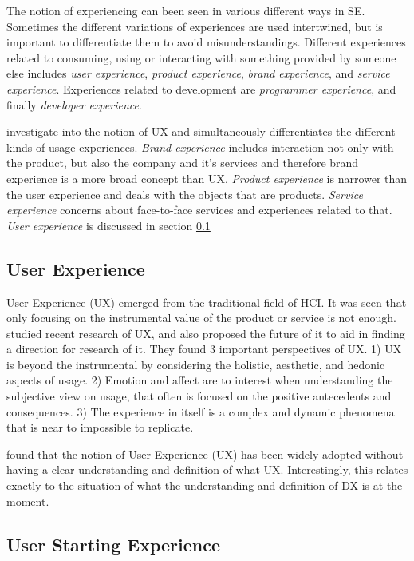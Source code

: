 \documentclass[english, 12pt, a4paper, sci, utf8, a-1b, online]{aaltothesis}
\begin{document}
The notion of experiencing can been seen in various different ways in SE. Sometimes the different variations of experiences are used intertwined, but is important to differentiate them to avoid misunderstandings. Different experiences related to consuming, using or interacting with something provided by someone else includes \textit{user experience}, \textit{product experience}, \textit{brand experience}, and \textit{service experience}. Experiences related to development are \textit{programmer experience}, and finally \textit{developer experience}.

\textcite{understanding-ux} investigate into the notion of UX and simultaneously differentiates the different kinds of usage experiences. \textit{Brand experience} includes interaction not only with the product, but also the company and it's services and therefore brand experience is a more broad concept than UX. \textit{Product experience} is narrower than the user experience and deals with the objects that are products. \textit{Service experience} concerns about face-to-face services and experiences related to that. \textit{User experience} is discussed in section \ref{section:ux}

\subsection{User Experience} \label{section:ux}

User Experience (UX) emerged from the traditional field of HCI. It was seen that only focusing on the instrumental value of the product or service is not enough. \textcite{ux-research-agenda} studied recent research of UX, and also proposed the future of it to aid in finding a direction for research of it. They found 3 important perspectives of UX. 1) UX is beyond the instrumental by considering the holistic, aesthetic, and hedonic aspects of usage. 2) Emotion and affect are to interest when understanding the subjective view on usage, that often is focused on the positive antecedents and consequences. 3) The experience in itself is a complex and dynamic phenomena that is near to impossible to replicate.

\textcite{understanding-ux} found that the notion of User Experience (UX) has been widely adopted without having a clear understanding and definition of what UX. Interestingly, this relates exactly to the situation of what the understanding and definition of DX is at the moment.

\subsection{User Starting Experience}
\end{document}

